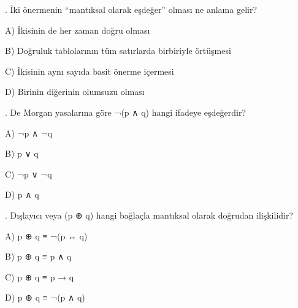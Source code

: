\par\smallskip{}. İki önermenin “mantıksal olarak eşdeğer” olması ne anlama gelir?

\par\noindent\hspace*{1.6em}A) İkisinin de her zaman doğru olması

\par\noindent\hspace*{1.6em}B) Doğruluk tablolarının tüm satırlarda birbiriyle örtüşmesi

\par\noindent\hspace*{1.6em}C) İkisinin aynı sayıda basit önerme içermesi

\par\noindent\hspace*{1.6em}D) Birinin diğerinin olumsuzu olması

\par\smallskip{}. De Morgan yasalarına göre ¬(p ∧ q) hangi ifadeye eşdeğerdir?

\par\noindent\hspace*{1.6em}A) ¬p ∧ ¬q

\par\noindent\hspace*{1.6em}B) p ∨ q

\par\noindent\hspace*{1.6em}C) ¬p ∨ ¬q

\par\noindent\hspace*{1.6em}D) p ∧ q

\par\smallskip{}. Dışlayıcı veya (p ⊕ q) hangi bağlaçla mantıksal olarak doğrudan ilişkilidir?

\par\noindent\hspace*{1.6em}A) p ⊕ q ≡ ¬(p ↔ q)

\par\noindent\hspace*{1.6em}B) p ⊕ q ≡ p ∧ q

\par\noindent\hspace*{1.6em}C) p ⊕ q ≡ p → q

\par\noindent\hspace*{1.6em}D) p ⊕ q ≡ ¬(p ∧ q)

